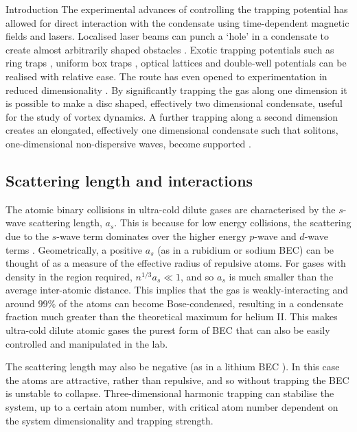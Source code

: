 \begin{chapter}{\label{cha:bose_gases}Introduction}
The experimental advances of controlling the trapping potential has allowed for direct interaction with the condensate using time-dependent magnetic fields and lasers. Localised laser beams can punch a `hole' in a condensate to create almost arbitrarily shaped obstacles \cite{Henderson09}. Exotic trapping potentials such as ring traps \cite{persistent,Ramanathan11}, uniform box traps \cite{gaunt_2013,chomaz_2015}, optical lattices \cite{Greiner02} and double-well \cite{PhysRevLett.106.025302} potentials can be realised with relative ease. The route has even opened to experimentation in reduced dimensionality \cite{Gorlitz,PhysRevLett.87.080403,PhysRevLett.91.250402,PhysRevLett.92.173003}. By significantly trapping the gas along one dimension it is possible to make a disc shaped, effectively two dimensional condensate, useful \cite{Neely,Freilich2010} for the study of vortex dynamics. A further trapping along a second dimension creates an elongated, effectively one dimensional condensate such that solitons, one-dimensional non-dispersive waves, become supported \cite{drazin1989solitons,PhysRevLett.101.120406}.

\subsection{Scattering length and interactions}
The atomic binary collisions in ultra-cold dilute gases are characterised by the $s$-wave scattering length, $a_s$. This is because for low energy collisions, the scattering due to the $s$-wave term dominates over the higher energy $p$-wave and $d$-wave terms \cite{Pethick}. Geometrically, a positive $a_s$ (as in a rubidium or sodium BEC) can be thought of as a measure of the effective radius of repulsive atoms. For gases with density in the region required, $n^{1/3}a_s \ll 1$, and so $a_s$ is much smaller than the average inter-atomic distance. This implies that the gas is weakly-interacting and around $99\%$ of the atoms can become Bose-condensed, resulting in a condensate fraction much greater than the theoretical maximum for helium II. This makes ultra-cold dilute atomic gases the purest form of BEC that can also be easily controlled and manipulated in the lab.

The scattering length may also be negative (as in a lithium BEC \cite{PhysRevLett.75.1687, PhysRevLett.78.985}). In this case the atoms are attractive, rather than repulsive, and so without trapping the BEC is unstable to collapse. Three-dimensional harmonic trapping can stabilise the system, up to a certain atom number, with critical atom number dependent on the system dimensionality and trapping strength.


\end{chapter}
